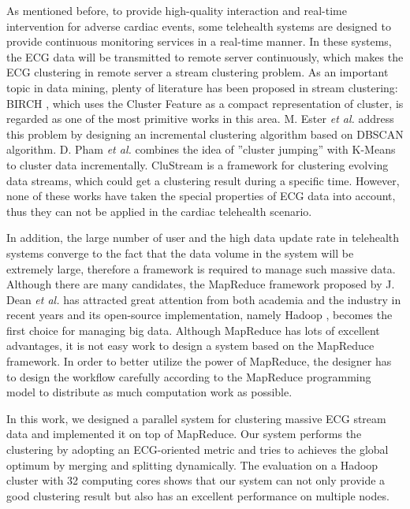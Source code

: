 \documentclass[conference]{IEEEtran}
\begin{document}
As mentioned before, to provide high-quality interaction and real-time intervention for adverse cardiac events, some telehealth systems are designed to provide continuous monitoring services in a real-time manner. In these systems, the ECG data will be transmitted to remote server continuously, which makes the ECG clustering in remote server a stream clustering problem. As an important topic in data mining, plenty of literature has been proposed in stream clustering: BIRCH \cite{Zhang:1996:BED:235968.233324}, which uses the Cluster Feature as a compact representation of cluster, is regarded as one of the most primitive works in this area. M. Ester \textit{et al.} \cite{Ester:1998:ICM:645924.671201} address this problem by designing an incremental clustering algorithm based on DBSCAN algorithm. D. Pham \textit{et al.} \cite{pham2004incremental} combines the idea of ''cluster jumping'' with K-Means to cluster data incrementally. CluStream \cite{aggarwal2003framework} is a framework for clustering evolving data streams, which could get a clustering result during a specific time. However, none of these works have taken the special properties of ECG data into account, thus they can not be applied in the cardiac telehealth scenario. 


In addition, the large number of user and the high data update rate in telehealth systems converge to the fact that the data volume in the system will be extremely large, therefore a framework is required to manage such massive data. Although there are many candidates, the MapReduce framework  proposed by J. Dean \textit{et al.} \cite{dean2008mapreduce} has attracted great attention from both academia and the industry in recent years and its open-source implementation, namely Hadoop \cite{white2010hadoop}, becomes the first choice for managing big data. Although MapReduce has lots of excellent advantages, it is not easy work to design a system based on the MapReduce framework. In order to better utilize the power of MapReduce, the designer has to design the workflow carefully according to the MapReduce programming model to distribute as much computation work as possible.


In this work, we designed a parallel system for clustering massive ECG stream data and implemented it on top of MapReduce. Our system performs the clustering by adopting an ECG-oriented metric and tries to achieves the global optimum by merging and splitting dynamically. The evaluation on a Hadoop cluster with 32 computing cores shows that our system can not only provide a good clustering result but also has an excellent performance on multiple nodes.
\end{document}
